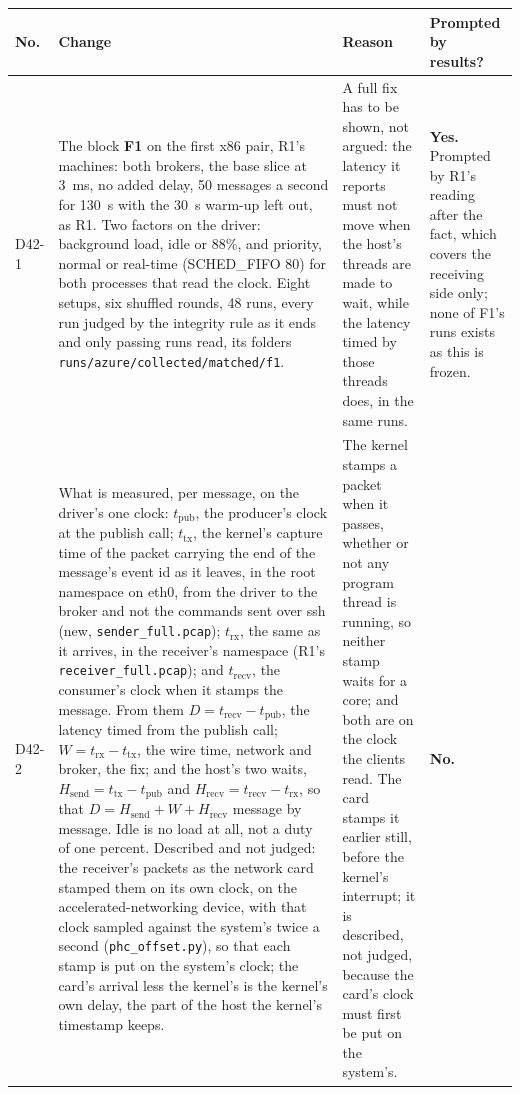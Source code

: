 \documentclass[11pt]{article}
\begin{document}
{\small
\begin{longtable}{@{}p{1.1cm} >{\raggedright\arraybackslash}p{6.1cm} >{\raggedright\arraybackslash}p{6.0cm} >{\raggedright\arraybackslash}p{2.2cm}@{}}
\toprule
\textbf{No.} & \textbf{Change} & \textbf{Reason} & \textbf{Prompted by results?} \\
\midrule
\endhead
D42-1 & The block \textbf{F1} on the first x86 pair, R1's machines: both brokers, the base slice at 3~ms, no added delay, 50 messages a second for 130~s with the 30~s warm-up left out, as R1. Two factors on the driver: background load, idle or 88\%, and priority, normal or real-time (SCHED\_FIFO 80) for both processes that read the clock. Eight setups, six shuffled rounds, 48 runs, every run judged by the integrity rule as it ends and only passing runs read, its folders \texttt{runs/azure/collected/matched/f1}. & A full fix has to be shown, not argued: the latency it reports must not move when the host's threads are made to wait, while the latency timed by those threads does, in the same runs. & \textbf{Yes.} Prompted by R1's reading after the fact, which covers the receiving side only; none of F1's runs exists as this is frozen. \\
D42-2 & What is measured, per message, on the driver's one clock: $t_{\mathrm{pub}}$, the producer's clock at the publish call; $t_{\mathrm{tx}}$, the kernel's capture time of the packet carrying the end of the message's event id as it leaves, in the root namespace on eth0, from the driver to the broker and not the commands sent over ssh (new, \texttt{sender\_full.pcap}); $t_{\mathrm{rx}}$, the same as it arrives, in the receiver's namespace (R1's \texttt{receiver\_full.pcap}); and $t_{\mathrm{recv}}$, the consumer's clock when it stamps the message. From them $D = t_{\mathrm{recv}} - t_{\mathrm{pub}}$, the latency timed from the publish call; $W = t_{\mathrm{rx}} - t_{\mathrm{tx}}$, the wire time, network and broker, the fix; and the host's two waits, $H_{\mathrm{send}} = t_{\mathrm{tx}} - t_{\mathrm{pub}}$ and $H_{\mathrm{recv}} = t_{\mathrm{recv}} - t_{\mathrm{rx}}$, so that $D = H_{\mathrm{send}} + W + H_{\mathrm{recv}}$ message by message. Idle is no load at all, not a duty of one percent. Described and not judged: the receiver's packets as the network card stamped them on its own clock, on the accelerated-networking device, with that clock sampled against the system's twice a second (\texttt{phc\_offset.py}), so that each stamp is put on the system's clock; the card's arrival less the kernel's is the kernel's own delay, the part of the host the kernel's timestamp keeps. & The kernel stamps a packet when it passes, whether or not any program thread is running, so neither stamp waits for a core; and both are on the clock the clients read. The card stamps it earlier still, before the kernel's interrupt; it is described, not judged, because the card's clock must first be put on the system's. & \textbf{No.} \\

\end{longtable}}
\end{document}

